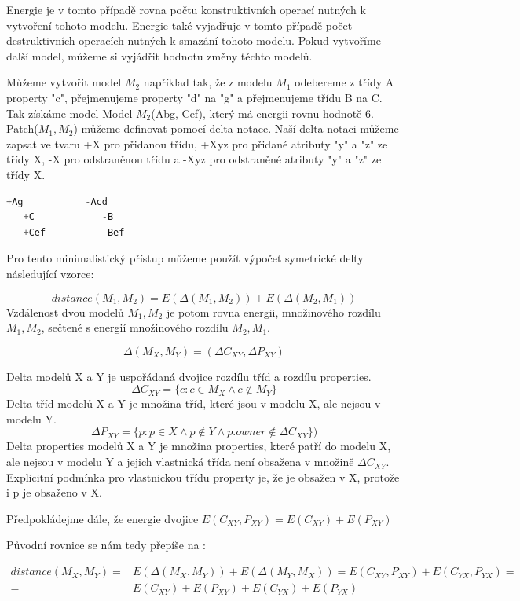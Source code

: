 \documentclass[11pt,twoside,a4paper]{book}
\begin{document}
Energie je v tomto případě rovna počtu konstruktivních operací nutných k
vytvoření tohoto modelu. Energie také vyjadřuje v tomto případě počet
destruktivních operacích nutných k smazání tohoto modelu. Pokud vytvoříme
další model, můžeme si vyjádřit hodnotu změny těchto modelů. 

Můžeme vytvořit model $M_2$ například tak, že z modelu $M_1$ odebereme z třídy A
property "c", přejmenujeme property "d" na "g" a přejmenujeme třídu B na C. Tak
získáme model Model $M_2$(Abg, Cef), který má energii rovnu hodnotě 6.
Patch($M_1, M_2$) můžeme definovat pomocí delta notace. Naší delta notaci můžeme
zapsat ve tvaru +X pro přidanou třídu, +Xyz pro přidané atributy "y" a "z" ze
třídy X, -X pro odstraněnou třídu a -Xyz pro odstraněné atributy "y" a "z" ze třídy X.

\FloatBarrier

\begin{lstlisting}[language=JAVA,frame=single,caption=Textový diff
modelů,label=algo:state:delta]
   +Ag           -Acd
   +C            -B
   +Cef          -Bef
\end{lstlisting}

\FloatBarrier

Pro tento minimalistický přístup můžeme použít výpočet symetrické delty
následující vzorce:

$$distance(M_1,M_2) = E(\Delta(M_1,M_2)) + E(\Delta(M_2, M_1))$$
Vzdálenost dvou modelů $M_1, M_2$ je potom rovna energii, množinového rozdílu
$M_1,M_2$, sečtené s energií množinového rozdílu $M_2, M_1$.

$$\Delta(M_X,M_Y) = (\Delta {C_{XY}}, \Delta{P_{XY}}) $$

Delta modelů X a Y je uspořádaná dvojice rozdílu tříd a rozdílu properties.
$$\Delta {C_{XY}} = \{c: c \in M_X \wedge c \notin M_Y\}$$
Delta tříd modelů X a Y je množina tříd, které jsou v modelu X, ale nejsou v
modelu Y.
 $$\Delta{P_{XY}} = \{p: p \in X \wedge p \notin Y \wedge p.owner
\notin \Delta {C_{XY}}\})$$
Delta properties modelů X a Y je množina properties, které patří do modelu X,
ale nejsou v modelu Y a jejich vlastnická třída není obsažena v množině  $\Delta
{C_{XY}}$. Explicitní podmínka pro vlastnickou třídu property je, že je obsažen
v X, protože i p je obsaženo v X.


Předpokládejme dále, že energie dvojice $E(C_{XY}, P_{XY}) = E(C_{XY}) +
E(P_{XY})$ 

Původní rovnice se nám tedy přepíše na :

\begin{align} distance(M_X,M_Y) = & E(\Delta(M_X,M_Y)) + E(\Delta(M_Y, M_X)) =
E(C_{XY}, P_{XY}) + E(C_{YX}, P_{YX}) = \nonumber \\ = & E(C_{XY}) + E(P_{XY}) +
E(C_{YX}) + E(P_{YX}) \nonumber
\end{align}
\end{document}

